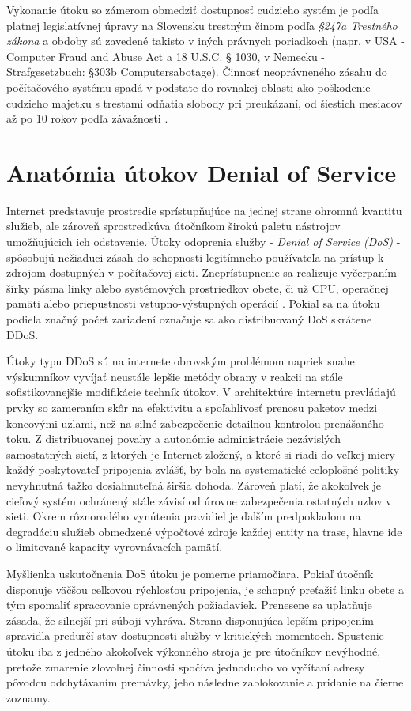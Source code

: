 \documentclass[12pt, a4paper]{article}
\begin{document}
Vykonanie útoku so zámerom obmedziť dostupnosť cudzieho systém je podľa platnej legislatívnej úpravy 
na Slovensku trestným činom podľa \emph{§247a Trestného zákona} a obdoby sú zavedené takisto v iných 
právnych poriadkoch (napr. v USA - Computer Fraud and Abuse Act a 18 U.S.C. § 1030, v Nemecku - 
Strafgesetzbuch: §303b  Computersabotage). Činnosť neoprávneného zásahu do počítačového systému spadá v 
podstate do rovnakej oblasti ako poškodenie cudzieho majetku s trestami odňatia slobody pri preukázaní, od 
šiestich mesiacov až po 10 rokov podľa závažnosti \cite{trestny-zakon}. 

\section{Anatómia útokov Denial of Service}
Internet predstavuje prostredie sprístupňujúce na jednej strane ohromnú kvantitu služieb, ale zároveň 
sprostredkúva útočníkom širokú paletu nástrojov umožňujúcich ich odstavenie. Útoky odoprenia služby
- \emph{Denial of Service (DoS)} - spôsobujú nežiaduci zásah do schopnosti legitímneho 
používateľa na prístup k zdrojom dostupných v počítačovej sieti. Zneprístupnenie sa realizuje vyčerpaním šírky pásma linky alebo systémových prostriedkov obete, či už CPU, operačnej pamäti alebo priepustnosti 
vstupno-výstupných operácií \cite{ddos-attacks}. Pokiaľ sa na útoku podieľa značný počet zariadení označuje 
sa ako distribuovaný DoS skrátene DDoS. 

Útoky typu DDoS sú na internete obrovským problémom napriek snahe výskumníkov vyvíjať neustále lepšie 
metódy obrany v reakcii na stále sofistikovanejšie modifikácie techník útokov. V architektúre internetu 
prevládajú prvky so zameraním skôr na efektivitu a spoľahlivosť prenosu paketov medzi koncovými uzlami, než 
na silné zabezpečenie detailnou kontrolou prenášaného toku. Z distribuovanej povahy a autonómie 
administrácie nezávislých samostatných sietí, z ktorých je Internet zložený, a ktoré si riadi 
do veľkej miery každý poskytovateľ pripojenia zvlášť, by bola na systematické celoplošné politiky nevyhnutná 
ťažko dosiahnuteľná širšia dohoda. Zároveň platí, že akokoľvek je cieľový systém ochránený stále závisí od 
úrovne zabezpečenia ostatných uzlov v sieti. Okrem rôznorodého vynútenia pravidiel je ďalším predpokladom na 
degradáciu služieb obmedzené výpočtové zdroje každej entity na trase, hlavne ide o limitované kapacity 
vyrovnávacích pamätí.

Myšlienka uskutočnenia DoS útoku je pomerne priamočiara. Pokiaľ útočník disponuje väčšou celkovou rýchlosťou 
pripojenia, je schopný preťažiť linku obete a tým spomaliť spracovanie oprávnených požiadaviek. Prenesene sa 
uplatňuje zásada, že silnejší pri súboji vyhráva. Strana disponujúca lepším pripojením spravidla predurčí 
stav dostupnosti služby v kritických momentoch. Spustenie útoku iba z jedného akokoľvek výkonného stroja
je pre útočníkov nevýhodné, pretože zmarenie zlovoľnej činnosti spočíva jednoducho vo vyčítaní adresy 
pôvodcu odchytávaním premávky, jeho následne zablokovanie a pridanie na čierne zoznamy. 
\end{document}
